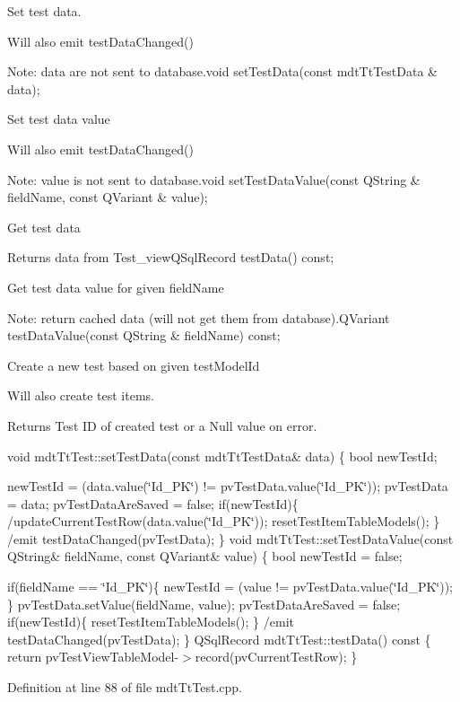 Set test data. 

Will also emit test\-Data\-Changed()

Note\-: data are not sent to database.\-void set\-Test\-Data(const mdt\-Tt\-Test\-Data \& data);

Set test data value

Will also emit test\-Data\-Changed()

Note\-: value is not sent to database.\-void set\-Test\-Data\-Value(const Q\-String \& field\-Name, const Q\-Variant \& value);

Get test data

Returns data from Test\-\_\-view\-Q\-Sql\-Record test\-Data() const;

Get test data value for given field\-Name

Note\-: return cached data (will not get them from database).Q\-Variant test\-Data\-Value(const Q\-String \& field\-Name) const;

Create a new test based on given test\-Model\-Id

Will also create test items.

\begin{DoxyReturn}{Returns}
Test I\-D of created test or a Null value on error.
\end{DoxyReturn}
void mdt\-Tt\-Test\-::set\-Test\-Data(const mdt\-Tt\-Test\-Data\& data) \{ bool new\-Test\-Id;

new\-Test\-Id = (data.\-value(\char`\"{}\-Id\-\_\-\-P\-K\char`\"{}) != pv\-Test\-Data.\-value(\char`\"{}\-Id\-\_\-\-P\-K\char`\"{})); pv\-Test\-Data = data; pv\-Test\-Data\-Are\-Saved = false; if(new\-Test\-Id)\{ /update\-Current\-Test\-Row(data.\-value(\char`\"{}\-Id\-\_\-\-P\-K\char`\"{})); reset\-Test\-Item\-Table\-Models(); \} /emit test\-Data\-Changed(pv\-Test\-Data); \} void mdt\-Tt\-Test\-::set\-Test\-Data\-Value(const Q\-String\& field\-Name, const Q\-Variant\& value) \{ bool new\-Test\-Id = false;

if(field\-Name == \char`\"{}\-Id\-\_\-\-P\-K\char`\"{})\{ new\-Test\-Id = (value != pv\-Test\-Data.\-value(\char`\"{}\-Id\-\_\-\-P\-K\char`\"{})); \} pv\-Test\-Data.\-set\-Value(field\-Name, value); pv\-Test\-Data\-Are\-Saved = false; if(new\-Test\-Id)\{ reset\-Test\-Item\-Table\-Models(); \} /emit test\-Data\-Changed(pv\-Test\-Data); \} Q\-Sql\-Record mdt\-Tt\-Test\-::test\-Data() const \{ return pv\-Test\-View\-Table\-Model-\/$>$record(pv\-Current\-Test\-Row); \} 

Definition at line 88 of file mdt\-Tt\-Test.\-cpp.




